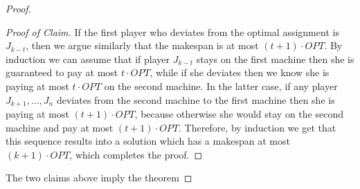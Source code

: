 \documentclass[12pt,a4paper]{article}
\theoremstyle{definition}
\theoremstyle{remark}
\begin{document}
\begin{proof}
\begin{proof}[Proof of Claim]
	If the first player who deviates from the optimal assignment is $J_{k-t}$, then we argue similarly that the makespan is at most $(t+1) \cdot OPT$. By induction we can assume that if player $J_{k-t}$ stays on the first machine then she is guaranteed to pay at most $t\cdot OPT$, while if she deviates then we know she is paying at most $t\cdot OPT$ on the second machine. In the latter case, if any player $J_{k+1}, \ldots, J_{n}$ deviates from the second machine to the first machine then she is paying at most $(t+1) \cdot OPT$, because otherwise she would stay on the second machine and pay at most $(t+1) \cdot OPT$. Therefore, by induction we get that this sequence results into a solution which has a makespan at most $(k+1)\cdot OPT$, which completes the proof.
\end{proof}

%

The two claims above imply the theorem\end{proof}
\end{document}

